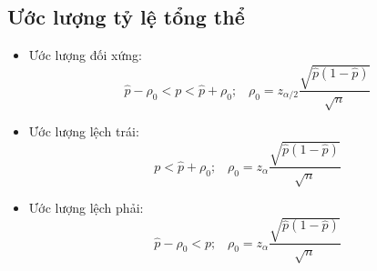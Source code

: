 \documentclass[utf8,a4paper]{article}
\begin{document}
\subsection[]{Ước lượng tỷ lệ tổng thể}
\begin{itemize}
  \item Ước lượng đối xứng:
    \[\hat{p} - {\rho}_{0} < p < \hat{p} + {\rho}_{0}; \;\;\;
      {\rho}_{0} = {z}_{\alpha / 2} \frac{\sqrt{\hat{p}\left(1 - \hat{p}\right)}}{\sqrt{n}}\]
  \item Ước lượng lệch trái:
    \[p < \hat{p} + {\rho}_{0}; \;\;\;
      {\rho}_{0} = {z}_{\alpha} \frac{\sqrt{\hat{p}\left(1 - \hat{p}\right)}}{\sqrt{n}}\]
  \item Ước lượng lệch phải:
    \[\hat{p} - {\rho}_{0} < p; \;\;\;
      {\rho}_{0} = {z}_{\alpha} \frac{\sqrt{\hat{p}\left(1 - \hat{p}\right)}}{\sqrt{n}}\]

\end{itemize}
\end{document}
